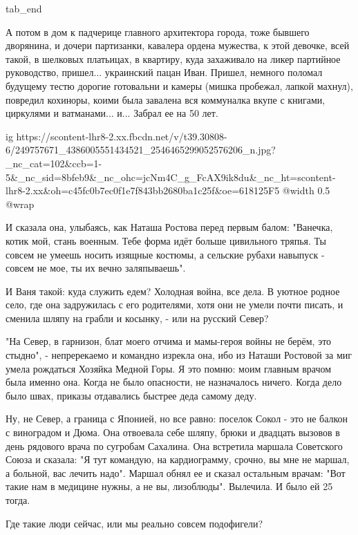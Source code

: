   tab_end
\fi

А потом в дом к падчерице главного архитектора города, тоже бывшего дворянина,
и дочери партизанки, кавалера ордена мужества, к этой девочке, всей такой, в
шелковых платьицах, в квартиру, куда захаживало на ликер партийное руководство,
пришел... украинский пацан Иван. Пришел, немного поломал будущему тестю дорогие
готовальни и камеры (мишка пробежал, лапкой махнул), повредил кохиноры, коими
была завалена вся коммуналка вкупе с книгами, циркулями и ватманами... и...
Забрал ее на 50 лет.

\ifcmt
  ig https://scontent-lhr8-2.xx.fbcdn.net/v/t39.30808-6/249757671_4386005551434521_2546465299052576206_n.jpg?_nc_cat=102&ccb=1-5&_nc_sid=8bfeb9&_nc_ohc=jcNm4C_g_FcAX9ik8du&_nc_ht=scontent-lhr8-2.xx&oh=c45fc0b7ec0f1e7f843bb2680ba1c25f&oe=618125F5
  @width 0.5
  @wrap 
\fi

И сказала она, улыбаясь, как Наташа Ростова перед первым балом: "Ванечка, котик
мой, стань военным. Тебе форма идёт больше цивильного тряпья. Ты совсем не
умеешь носить изящные костюмы, а сельские рубахи навыпуск - совсем не мое, ты
их вечно заляпываешь".

И Ваня такой: куда служить едем? Холодная война, все дела. В уютное родное
село, где она задружилась с его родителями, хотя они не умели почти писать, и
сменила шляпу на грабли и косынку, - или на русский Север? 

"На Север, в гарнизон, блат моего отчима и мамы-героя войны не берём, это
стыдно", - непререкаемо и командно изрекла она, ибо из Наташи Ростовой за миг
умела рождаться Хозяйка Медной Горы. Я это помню: моим главным врачом была
именно она. Когда не было опасности, не назначалось ничего. Когда дело было
швах, приказы отдавались быстрее деда самому деду. 

Ну, не Север, а граница с Японией, но все равно: поселок Сокол - это не балкон
с виноградом и Дюма. Она отвоевала себе шляпу, брюки и двадцать вызовов в день
рядового врача по сугробам Сахалина. Она встретила маршала Советского Союза и
сказала: "Я тут командую, на кардиограмму, срочно, вы мне не маршал, а больной,
вас лечить надо". Маршал обнял ее и сказал остальным врачам: "Вот такие нам в
медицине нужны, а не вы, лизоблюды". Вылечила. И было ей 25 тогда.

Где такие люди сейчас, или мы реально совсем подофигели?
